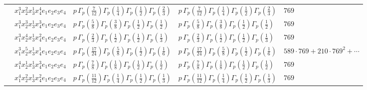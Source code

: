 \documentclass[11pt]{article}
\begin{document}
\begin{table}[ht]
{\begin{tabular}{@{}lllll@{}}
 & $x_{1}^{3} x_{2}^{2} x_{3}^{1} x_{4}^{4}  e_{1} e_{2} e_{3} e_{4}$ & $p \, \Gamma_p \left( \frac{7}{12} \right) \Gamma_p \left( \frac{1}{4} \right) \Gamma_p \left( \frac{1}{2} \right) \Gamma_p \left( \frac{2}{3} \right)$ & $p \, \Gamma_p \left( \frac{7}{12} \right) \Gamma_p \left( \frac{1}{4} \right) \Gamma_p \left( \frac{1}{2} \right) \Gamma_p \left( \frac{2}{3} \right)$ & $769$ \\
 & $x_{1}^{3} x_{2}^{3} x_{3}^{1} x_{4}^{3}  e_{1} e_{2} e_{3} e_{4}$ & $p \, \Gamma_p \left( \frac{5}{8} \right) \Gamma_p \left( \frac{3}{8} \right) \Gamma_p \left( \frac{1}{2} \right) \Gamma_p \left( \frac{1}{2} \right)$ & $p \, \Gamma_p \left( \frac{5}{8} \right) \Gamma_p \left( \frac{3}{8} \right) \Gamma_p \left( \frac{1}{2} \right) \Gamma_p \left( \frac{1}{2} \right)$ & $769$ \\
 & $x_{1}^{3} x_{2}^{4} x_{3}^{1} x_{4}^{2}  e_{1} e_{2} e_{3} e_{4}$ & $p \, \Gamma_p \left( \frac{2}{3} \right) \Gamma_p \left( \frac{1}{2} \right) \Gamma_p \left( \frac{1}{2} \right) \Gamma_p \left( \frac{1}{3} \right)$ & $p \, \Gamma_p \left( \frac{2}{3} \right) \Gamma_p \left( \frac{1}{2} \right) \Gamma_p \left( \frac{1}{2} \right) \Gamma_p \left( \frac{1}{3} \right)$ & $769$ \\
 & $x_{1}^{3} x_{2}^{5} x_{3}^{1} x_{4}^{1}  e_{1} e_{2} e_{3} e_{4}$ & $p \, \Gamma_p \left( \frac{17}{24} \right) \Gamma_p \left( \frac{5}{8} \right) \Gamma_p \left( \frac{1}{2} \right) \Gamma_p \left( \frac{1}{6} \right)$ & $p \, \Gamma_p \left( \frac{17}{24} \right) \Gamma_p \left( \frac{5}{8} \right) \Gamma_p \left( \frac{1}{2} \right) \Gamma_p \left( \frac{1}{6} \right)$ & $589{\cdot}769{+}210{\cdot}769^{2}{+}\cdots$ \\
 & $x_{1}^{4} x_{2}^{1} x_{3}^{1} x_{4}^{3}  e_{1} e_{2} e_{3} e_{4}$ & $p \, \Gamma_p \left( \frac{7}{8} \right) \Gamma_p \left( \frac{1}{8} \right) \Gamma_p \left( \frac{1}{2} \right) \Gamma_p \left( \frac{1}{2} \right)$ & $p \, \Gamma_p \left( \frac{7}{8} \right) \Gamma_p \left( \frac{1}{8} \right) \Gamma_p \left( \frac{1}{2} \right) \Gamma_p \left( \frac{1}{2} \right)$ & $769$ \\
 & $x_{1}^{4} x_{2}^{2} x_{3}^{1} x_{4}^{2}  e_{1} e_{2} e_{3} e_{4}$ & $p \, \Gamma_p \left( \frac{11}{12} \right) \Gamma_p \left( \frac{1}{4} \right) \Gamma_p \left( \frac{1}{2} \right) \Gamma_p \left( \frac{1}{3} \right)$ & $p \, \Gamma_p \left( \frac{11}{12} \right) \Gamma_p \left( \frac{1}{4} \right) \Gamma_p \left( \frac{1}{2} \right) \Gamma_p \left( \frac{1}{3} \right)$ & $769$ \\

\end{tabular}}
\end{table}
\end{document}
